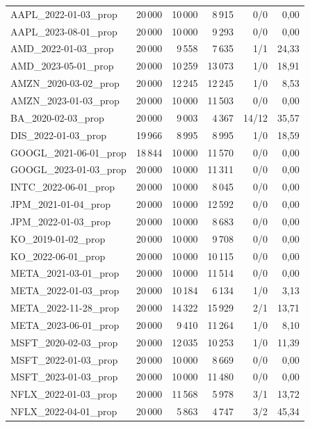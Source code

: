 \begin{longtable}{lrrrrr}
AAPL\_2022-01-03\_prop & 20\,000 & 10\,000 & 8\,915 & 0/0 & 0,00 \\
AAPL\_2023-08-01\_prop & 20\,000 & 10\,000 & 9\,293 & 0/0 & 0,00 \\
AMD\_2022-01-03\_prop & 20\,000 & 9\,558 & 7\,635 & 1/1 & 24,33 \\
AMD\_2023-05-01\_prop & 20\,000 & 10\,259 & 13\,073 & 1/0 & 18,91 \\
AMZN\_2020-03-02\_prop & 20\,000 & 12\,245 & 12\,245 & 1/0 & 8,53 \\
AMZN\_2023-01-03\_prop & 20\,000 & 10\,000 & 11\,503 & 0/0 & 0,00 \\
BA\_2020-02-03\_prop & 20\,000 & 9\,003 & 4\,367 & 14/12 & 35,57 \\
DIS\_2022-01-03\_prop & 19\,966 & 8\,995 & 8\,995 & 1/0 & 18,59 \\
GOOGL\_2021-06-01\_prop & 18\,844 & 10\,000 & 11\,570 & 0/0 & 0,00 \\
GOOGL\_2023-01-03\_prop & 20\,000 & 10\,000 & 11\,311 & 0/0 & 0,00 \\
INTC\_2022-06-01\_prop & 20\,000 & 10\,000 & 8\,045 & 0/0 & 0,00 \\
JPM\_2021-01-04\_prop & 20\,000 & 10\,000 & 12\,592 & 0/0 & 0,00 \\
JPM\_2022-01-03\_prop & 20\,000 & 10\,000 & 8\,683 & 0/0 & 0,00 \\
KO\_2019-01-02\_prop & 20\,000 & 10\,000 & 9\,708 & 0/0 & 0,00 \\
KO\_2022-06-01\_prop & 20\,000 & 10\,000 & 10\,115 & 0/0 & 0,00 \\
META\_2021-03-01\_prop & 20\,000 & 10\,000 & 11\,514 & 0/0 & 0,00 \\
META\_2022-01-03\_prop & 20\,000 & 10\,184 & 6\,134 & 1/0 & 3,13 \\
META\_2022-11-28\_prop & 20\,000 & 14\,322 & 15\,929 & 2/1 & 13,71 \\
META\_2023-06-01\_prop & 20\,000 & 9\,410 & 11\,264 & 1/0 & 8,10 \\
MSFT\_2020-02-03\_prop & 20\,000 & 12\,035 & 10\,253 & 1/0 & 11,39 \\
MSFT\_2022-01-03\_prop & 20\,000 & 10\,000 & 8\,669 & 0/0 & 0,00 \\
MSFT\_2023-01-03\_prop & 20\,000 & 10\,000 & 11\,480 & 0/0 & 0,00 \\
NFLX\_2022-01-03\_prop & 20\,000 & 11\,568 & 5\,978 & 3/1 & 13,72 \\
NFLX\_2022-04-01\_prop & 20\,000 & 5\,863 & 4\,747 & 3/2 & 45,34 \\

\end{longtable}
